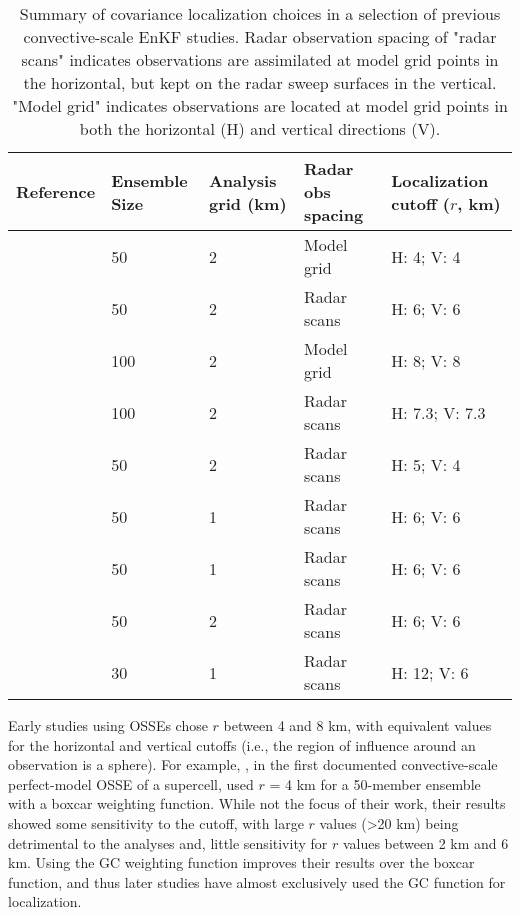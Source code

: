 \begin{table}
\centering
\begin{tabular}{ r || m{2cm} | m{1.5cm} | m{2.5cm} | m{2.5cm} }
Reference & Ensemble Size & Analysis grid (km) & Radar obs spacing & Localization cutoff (\(r\), km) \\
\hline \hline
\citet{snyderzhang03} & 50 & 2 & Model grid & H: 4; V: 4 \\
\citet{dowelletal04} & 50 & 2 & Radar scans & H: 6; V: 6 \\
\citet{tongxue05} & 100 & 2 & Model grid & H: 8; V: 8 \\
\citet{cayaetal05} & 100 & 2 & Radar scans & H: 7.3; V: 7.3 \\
\citet{aksoyetal09} & 50 & 2 & Radar scans & H: 5; V: 4 \\
\citet{dowellwicker09} & 50 & 1 & Radar scans & H: 6; V: 6 \\
\citet{dowelletal11} & 50 & 1 & Radar scans & H: 6; V: 6 \\
\citet{dongetal11} & 50 & 2 & Radar scans & H: 6; V: 6 \\
\citet{dawsonetal12} & 30 & 1 & Radar scans & H: 12; V: 6 \\
\end{tabular}
\caption{Summary of covariance localization choices in a selection of previous convective-scale EnKF studies. Radar observation spacing of "radar scans" indicates observations are assimilated at model grid points in the horizontal, but kept on the radar sweep surfaces in the vertical. "Model grid" indicates observations are located at model grid points in both the horizontal (H) and vertical directions (V).}
\label{covlocsummary}
\end{table}

Early studies using OSSEs chose \( r \) between 4 and 8 km, with equivalent values for the horizontal and vertical cutoffs (i.e., the region of influence around an observation is a sphere). For example, \citet{snyderzhang03}, in the first documented convective-scale perfect-model OSSE of a supercell, used \( r \) = 4 km for a 50-member ensemble with a boxcar weighting function. While not the focus of their work, their results showed some sensitivity to the cutoff, with large \( r \) values (\textgreater 20 km) being detrimental to the analyses and, little sensitivity for \( r \) values between 2 km and 6 km. Using the GC weighting function improves their results over the boxcar function, and thus later studies have almost exclusively used the GC function for localization.

